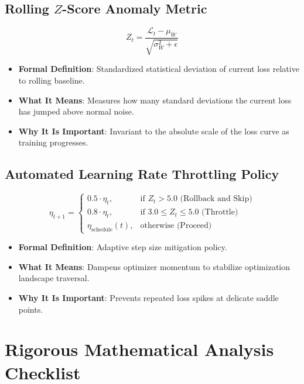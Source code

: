 \documentclass[11pt,a4paper]{article}
\theoremstyle{definition}
\begin{document}
\subsection{Rolling $Z$-Score Anomaly Metric}
{\boldmath
\begin{equation}
Z_t = \frac{\mathcal{L}_t - \mu_W}{\sqrt{\sigma_W^2 + \epsilon}}
\end{equation}
}
\begin{itemize}
    \item \textbf{Formal Definition}: Standardized statistical deviation of current loss relative to rolling baseline.
    \item \textbf{What It Means}: Measures how many standard deviations the current loss has jumped above normal noise.
    \item \textbf{Why It Is Important}: Invariant to the absolute scale of the loss curve as training progresses.
\end{itemize}

\subsection{Automated Learning Rate Throttling Policy}
{\boldmath
\begin{equation}
\eta_{t+1} = \begin{cases}
0.5 \cdot \eta_t, & \text{if } Z_t > 5.0 \text{ (Rollback and Skip)} \\
0.8 \cdot \eta_t, & \text{if } 3.0 \le Z_t \le 5.0 \text{ (Throttle)} \\
\eta_{\text{schedule}}(t), & \text{otherwise (Proceed)}
\end{cases}
\end{equation}
}
\begin{itemize}
    \item \textbf{Formal Definition}: Adaptive step size mitigation policy.
    \item \textbf{What It Means}: Dampens optimizer momentum to stabilize optimization landscape traversal.
    \item \textbf{Why It Is Important}: Prevents repeated loss spikes at delicate saddle points.
\end{itemize}

\section{Rigorous Mathematical Analysis Checklist}
\end{document}
